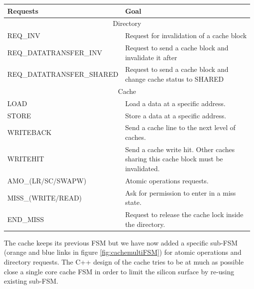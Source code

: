 \documentclass[10pt,letterpaper]{article}
\begin{document}
\begin{center}
\begin{tabular}{ |p{6cm}||p{6cm}|  }
 \hline
 Requests & Goal\\
 \hline
 \multicolumn{2}{|c|}{Directory} \\
 \hline
 REQ\_INV   & Request for invalidation of a cache block \\
 \hline
 REQ\_DATATRANSFER\_INV&  Request to send a cache block and invalidate it after \\
 \hline
 REQ\_DATATRANSFER\_SHARED & Request to send a cache block and change cache status to SHARED \\
 \hline
 \multicolumn{2}{|c|}{Cache} \\
 \hline
 LOAD &   Load a data at a specific address.\\
 \hline
 STORE & Store a data at a specific address.\\
 \hline
 WRITEBACK & Send a cache line to the next level of caches.\\
 \hline
 WRITEHIT & Send a cache write hit. Other caches sharing this cache block must be invalidated.\\
 \hline
 AMO\_(LR/SC/SWAPW) &  Atomic operations requests. \\
 \hline
 MISS\_(WRITE/READ) & Ask for permission to enter in a miss state.\\
 \hline
 END\_MISS & Request to release the cache lock inside the directory.\\
 \hline
\end{tabular}
\end{center}

\noindent The cache keeps its previous FSM but we have now added a specific sub-FSM (orange and blue links in figure \ref{fig:cachemultiFSM}) for atomic operations and directory requests. The C++ design of the cache tries to be at much as possible close a single core cache FSM in order to limit the silicon surface by re-using existing sub-FSM. 
\end{document}
